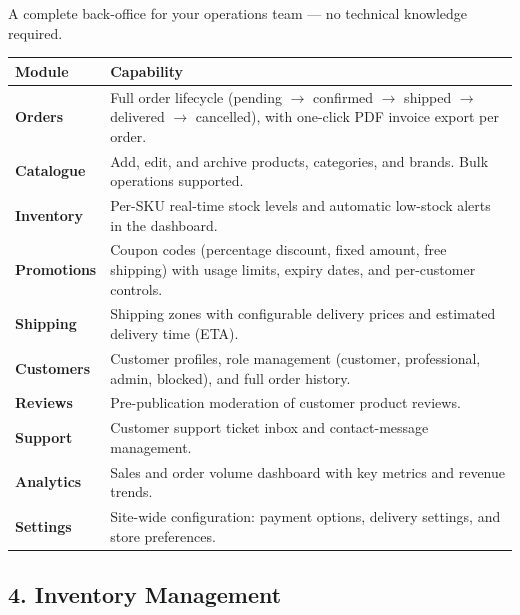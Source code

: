 \documentclass[11pt,a4paper]{article}
\begin{document}
A complete back-office for your operations team --- no technical
knowledge required.

\begin{center}
\renewcommand{\arraystretch}{1.5}
\begin{tabular}{@{}p{3.8cm}p{10.5cm}@{}}
\toprule
\textbf{Module} & \textbf{Capability} \\
\midrule
\textbf{Orders}       & Full order lifecycle (pending $\rightarrow$
                         confirmed $\rightarrow$ shipped $\rightarrow$
                         delivered $\rightarrow$ cancelled), with
                         one-click PDF invoice export per order. \\
\textbf{Catalogue}    & Add, edit, and archive products, categories,
                         and brands. Bulk operations supported. \\
\textbf{Inventory}    & Per-SKU real-time stock levels and automatic
                         low-stock alerts in the dashboard. \\
\textbf{Promotions}   & Coupon codes (percentage discount, fixed
                         amount, free shipping) with usage limits,
                         expiry dates, and per-customer controls. \\
\textbf{Shipping}     & Shipping zones with configurable delivery
                         prices and estimated delivery time (ETA). \\
\textbf{Customers}    & Customer profiles, role management (customer,
                         professional, admin, blocked), and full
                         order history. \\
\textbf{Reviews}      & Pre-publication moderation of customer
                         product reviews. \\
\textbf{Support}      & Customer support ticket inbox and
                         contact-message management. \\
\textbf{Analytics}    & Sales and order volume dashboard with
                         key metrics and revenue trends. \\
\textbf{Settings}     & Site-wide configuration: payment options,
                         delivery settings, and store preferences. \\
\bottomrule
\end{tabular}
\end{center}

\subsection{4. Inventory Management}
\end{document}
